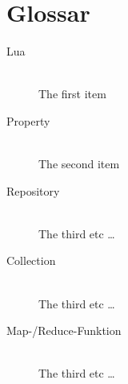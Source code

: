 
\section{Glossar}

\begin{description}
  \item[Lua] \hfill \\
  The first item
  \item[Property] \hfill \\
  The second item
  \item[Repository] \hfill \\
  The third etc \ldots
  \item[Collection] \hfill \\
  The third etc \ldots
  \item[Map-/Reduce-Funktion] \hfill \\
  The third etc \ldots
\end{description}
